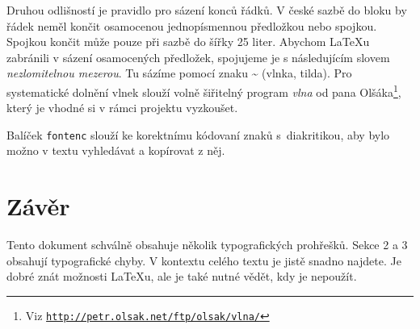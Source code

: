 \documentclass [10pt, a4paper, twocolumn] {article}
\begin{document}
Druhou odlišností je pravidlo pro sázení konců řádků.
V české sazbě do bloku by řádek neměl končit osamocenou jednopísmennou předložkou nebo spojkou.
Spojkou  končit může pouze při sazbě do šířky 25 liter.
Abychom \LaTeX u zabránili v sázení osamocených předložek, spojujeme je s následujícím slovem \textit{nezlomitelnou mezerou}.
Tu sázíme pomocí znaku \textbf{\~{}} (vlnka, tilda).
Pro systematické dolnění  vlnek slouží volně šiřitelný program \textit{vlna} od pana Olšáka\footnote [2] {Viz \texttt{\href{http://petr.olsak.net/ftp/olsak/vlna/}{http://petr.olsak.net/ftp/olsak/vlna/}}}, který je vhodné si v rámci projektu vyzkoušet.

Balíček \texttt{fontenc} slouží ke korektnímu kódovaní znaků s~diakritikou, aby bylo možno v textu vyhledávat a kopírovat z něj.


\section{Závěr}

Tento dokument schválně obsahuje několik typografických prohřešků.
Sekce 2 a 3 obsahují typografické chyby.
V kontextu celého textu je jistě snadno najdete.
Je dobré znát možnosti \LaTeX u, ale je také nutné vědět, kdy je nepoužít.
\end{document}
